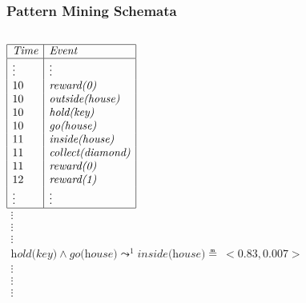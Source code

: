 \documentclass[aspectratio=169]{beamer}
\newcommand{\lpreimp}[1]{\leadsto^{#1}}
\begin{document}
\begin{frame}
  \frametitle{Pattern Mining Schemata}



  \begin{columns}
    \column{3cm}
    $
    \begin{array}{|l|l|}
      \hline
      \textit{Time} & \textit{Event} \\
      \hline
      \vdots & \vdots \\
      10 & \textit{reward(0)} \\
      10 & \textit{outside(house)} \\
      10 & \textit{hold(key)} \\
      10 & \textit{go(house)} \\
      11 & \textit{inside(house)} \\
      11 & \textit{collect(diamond)} \\
      11 & \textit{reward(0)} \\
      12 & \textit{reward(1)} \\
      \vdots & \vdots \\
      \hline
    \end{array}
    $
    \column{9cm}
    $
    \begin{array}{c}
      \vdots \\
      \vdots \\
      \vdots \\
      \textit{hold(key)} \land \textit{go(house)} \lpreimp{1}
      \textit{inside(house)} \measeq\ <\!0.83, 0.007\!> \\
      \vdots \\
      \vdots \\
      \vdots
    \end{array}
    $
  \end{columns}


\end{frame}
\end{document}
